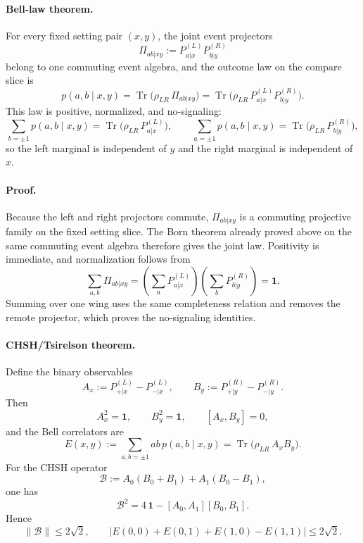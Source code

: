 \documentclass[11pt]{article}
\begin{document}
\paragraph{Bell-law theorem.}
For every fixed setting pair \((x,y)\), the joint event projectors
\[
\Pi_{ab|xy}:=P_{a|x}^{(L)}P_{b|y}^{(R)}
\]
belong to one commuting event algebra, and the outcome law on the compare slice is
\begin{equation}
p(a,b\mid x,y)
=
\operatorname{Tr}\!\bigl(\rho_{LR}\,\Pi_{ab|xy}\bigr)
=
\operatorname{Tr}\!\bigl(\rho_{LR}\,P_{a|x}^{(L)}P_{b|y}^{(R)}\bigr).
\end{equation}
This law is positive, normalized, and no-signaling:
\begin{equation}
\sum_{b=\pm1} p(a,b\mid x,y)
=
\operatorname{Tr}\!\bigl(\rho_{LR}\,P_{a|x}^{(L)}\bigr),
\qquad
\sum_{a=\pm1} p(a,b\mid x,y)
=
\operatorname{Tr}\!\bigl(\rho_{LR}\,P_{b|y}^{(R)}\bigr),
\end{equation}
so the left marginal is independent of \(y\) and the right marginal is independent of \(x\).

\paragraph{Proof.}
Because the left and right projectors commute, \(\Pi_{ab|xy}\) is a commuting projective family on
the fixed setting slice. The Born theorem already proved above on the same commuting event algebra
therefore gives the joint law. Positivity is immediate, and normalization follows from
\[
\sum_{a,b}\Pi_{ab|xy}
=
\left(\sum_a P_{a|x}^{(L)}\right)\left(\sum_b P_{b|y}^{(R)}\right)
=
\mathbf 1.
\]
Summing over one wing uses the same completeness relation and removes the remote projector, which
proves the no-signaling identities.

\paragraph{CHSH/Tsirelson theorem.}
Define the binary observables
\[
A_x:=P_{+|x}^{(L)}-P_{-|x}^{(L)},
\qquad
B_y:=P_{+|y}^{(R)}-P_{-|y}^{(R)}.
\]
Then
\[
A_x^2=\mathbf 1,
\qquad
B_y^2=\mathbf 1,
\qquad
[A_x,B_y]=0,
\]
and the Bell correlators are
\begin{equation}
E(x,y)
:=
\sum_{a,b=\pm1}ab\,p(a,b\mid x,y)
=
\operatorname{Tr}\!\bigl(\rho_{LR}\,A_xB_y\bigr).
\end{equation}
For the CHSH operator
\begin{equation}
\mathcal B
:=
A_0(B_0+B_1)+A_1(B_0-B_1),
\end{equation}
one has
\begin{equation}
\mathcal B^2
=
4\,\mathbf 1-[A_0,A_1][B_0,B_1].
\end{equation}
Hence
\begin{equation}
\|\mathcal B\|
\le
2\sqrt 2,
\qquad
\bigl|E(0,0)+E(0,1)+E(1,0)-E(1,1)\bigr|
\le
2\sqrt 2.
\end{equation}
\end{document}
